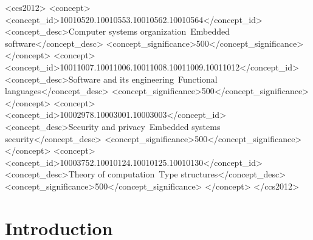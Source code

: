 \documentclass[sigconf]{acmart}
\begin{document}
\begin{CCSXML}
<ccs2012>
   <concept>
       <concept_id>10010520.10010553.10010562.10010564</concept_id>
       <concept_desc>Computer systems organization~Embedded software</concept_desc>
       <concept_significance>500</concept_significance>
       </concept>
   <concept>
       <concept_id>10011007.10011006.10011008.10011009.10011012</concept_id>
       <concept_desc>Software and its engineering~Functional languages</concept_desc>
       <concept_significance>500</concept_significance>
       </concept>
   <concept>
       <concept_id>10002978.10003001.10003003</concept_id>
       <concept_desc>Security and privacy~Embedded systems security</concept_desc>
       <concept_significance>500</concept_significance>
       </concept>
   <concept>
       <concept_id>10003752.10010124.10010125.10010130</concept_id>
       <concept_desc>Theory of computation~Type structures</concept_desc>
       <concept_significance>500</concept_significance>
       </concept>
 </ccs2012>
\end{CCSXML}





\maketitle


\section{Introduction}
\end{document}
